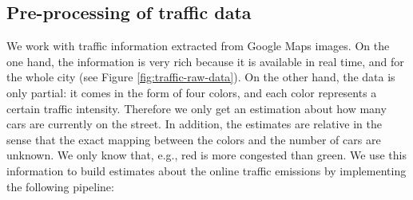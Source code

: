 \documentclass[11pt,a4paper,twoside]{article}
\newcommand{\asmodif}[2]{{\color{teal} #1} {\sout{#2}}}
\theoremstyle{definition}
\numberwithin{equation}{section}
\newcommand{\<}{\langle}
\renewcommand{\>}{\rangle}
\begin{document}
\subsection{Pre-processing of traffic data}
\label{sec:traffic-preprocess}
\asmodif{
We work with traffic information extracted from Google Maps images. On the one hand, the information is very rich because it is available in real time, and for the whole city (see Figure \ref{fig:traffic-raw-data}). On the other hand, the data is only partial: it comes in the form of four colors, and each color represents a certain traffic intensity. Therefore we only get an estimation about how many cars are currently on the street. In addition, the estimates are relative in the sense that the exact mapping between the colors and the number of cars are unknown. We only know that, e.g., red is more congested than green. We use this information to build estimates about the online traffic emissions by implementing the following pipeline:
}{}
\end{document}
